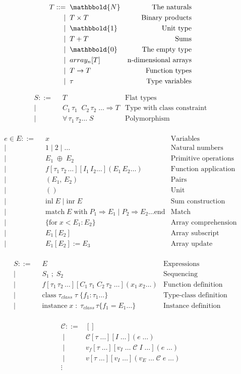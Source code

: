 \documentclass[10pt,letter]{article}
\newcommand{\pipe}[0]{\;|\;}
\newcommand{\nats}[0]{\mathbbold{N}}
\renewcommand{\plus}[0]{+}
\newcommand{\funcArrow}[0]{\to}
\newcommand{\matchArrow}[0]{\Rightarrow}
\newcommand{\constraintArrow}[0]{\Rightarrow}
\newcommand{\unitType}[0]{\mathbbold{1}}
\newcommand{\nullType}[0]{\mathbbold{0}}
\newcommand{\functionApp}[4]{#1 [#2] [#3] (#4)}
\newcommand{\functionAppDotsp}[4]{\functionApp{#1}{#2_1\,#2_2\,\dots}{#3}{#4_1\,#4_2 \dots}}
\newcommand{\ctx}[0]{\mathcal{C}}
\newcommand{\firstAlt}[2]{\;\;&#1 & \text{#2}\\}
\newcommand{\alt}[2]{| \firstAlt{#1}{#2}}
\begin{document}
\begin{align*}
  T ::= \firstAlt{\nats}{The naturals}
        \alt{T \times T}{Binary products}
        \alt{\unitType}{Unit type}
        \alt{T \plus T}{Sums}
        \alt{\nullType}{The empty type}
        \alt{array_n[T]}{n-dimensional arrays}
        \alt{T \funcArrow T}{Function types}
        \alt{\tau}{Type variables}
\end{align*}

\begin{align*}
  S ::= \firstAlt{T}{Flat types}
        \alt{C_1 \, \tau_1 \;\; C_2 \, \tau_2\; \dots \constraintArrow T}
            {Type with class constraint}
        \alt{\forall \,\tau_1\, \tau_2 \dots\; S}{Polymorphism}
\end{align*}

\begin{align*}
  e \in E ::= \firstAlt{x}{Variables}
        \alt{1 \;|\; 2 \;|\; \dots}{Natural numbers}
        \alt{E_1 \; \oplus \; E_2}{Primitive operations}
        \alt{\functionAppDotsp{f}{\tau}{I_1\,I_2\dots}{E}}
            {Function application}
        \alt{(E_1,\, E_2)}{Pairs}
        \alt{()}{Unit}
        \alt{\mathrm{inl}\; E \;|\; \mathrm{inr}\; E}{Sum construction}
        \alt{\mathrm{match}\; E \;\mathrm{with}\;
               P_1 \matchArrow E_1 \;|\;
               P_2 \matchArrow E_2 \dots
               \mathrm{end}}{Match}
        \alt{\{ \mathrm{for}\; x < E_1 : E_2 \} }{Array comprehension}
        \alt{E_1[E_2]}{Array subscript}
        \alt{E_1[E_2] := E_3}{Array update}
\end{align*}

\begin{align*}
  S ::= \firstAlt{E}{Expressions}
        \alt{S_1 \;;\; S_2}{Sequencing}
        \alt{\functionAppDotsp{f}{\tau}{C_1\,\tau_1\;C_2\,\tau_2\;\dots}{x}}
            {Function definition}
        \alt{\mathrm{class}\; \tau_{class}\; \tau \; \{ f_1 : \tau_1 \dots \} }
            {Type-class definition}
        \alt{\mathrm{instance}\; x \;:\; \tau_{class} \, \tau \{ f_1 = E_1 \dots \}}
            {Instance definition}
\end{align*}

\begin{align*}
  \ctx ::=& [] \\
     \pipe& \functionApp{\ctx}{\tau\;\dots}{I\;\dots}{e\;\dots} \\
     \pipe& \functionApp{v_f}{\tau\;\dots}{v_I\;\dots\;\ctx\;I\;\dots}{e\;\dots} \\
     \pipe& \functionApp{v}{\tau\;\dots}{v_I\;\dots}{v_E\;\dots\;\ctx\;e\;\dots} \\
     \vdots&
\end{align*}
\end{document}
